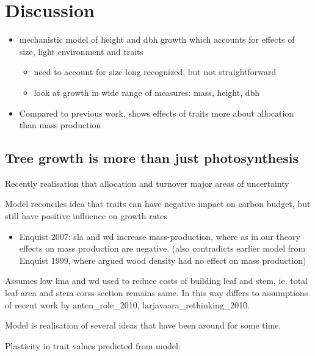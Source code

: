 \documentclass[12pt, a4paper]{article}
\begin{document}
\section*{Discussion}\label{discussion}

\begin{itemize}
\itemsep1pt\parskip0pt
\item
  mechanistic model of height and dbh growth which accounts for effects
  of size, light environment and traits

  \begin{itemize}
  \itemsep1pt\parskip0pt
  \item
    need to account for size long recognized, but not straightforward
  \item
    look at growth in wide range of measures: mass, height, dbh
  \end{itemize}
\item
  Compared to previous work, shows effects of traits more about
  allocation than mass production
\end{itemize}

\subsection*{Tree growth is more than just
photosynthesis}\label{tree-growth-is-more-than-just-photosynthesis}

Recently realisation that allocation and turnover major areas of
uncertainty

Model reconciles idea that traits can have negative impact on carbon
budget, but still have positive influence on growth rates

\begin{itemize}
\itemsep1pt\parskip0pt
\item
  Enquist 2007: sla and wd increase mass-production, where as in our
  theory effects on mass production are negative. (also contradicts
  earlier model from Enquist 1999, where argued wood density had no
  effect on mass production)
\end{itemize}

Assumes low lma and wd used to reduce costs of building leaf and stem,
ie. total leaf area and stem corss section remains same. In this way
differs to assumptions of recent work by anten\_role\_2010,
larjavaara\_rethinking\_2010.

Model is realisation of several ideas that have been around for some
time.

Plasticity in trait values predicted from model:
\end{document}
